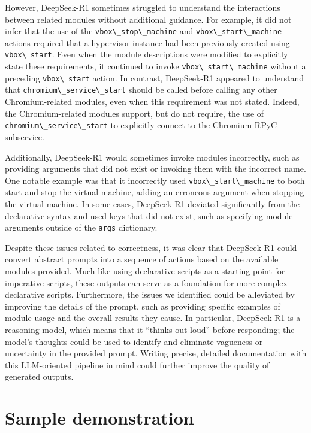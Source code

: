 \documentclass[preprint,12pt]{elsarticle}
\newcommand{\passthrough}[1]{#1}
\begin{document}
However, DeepSeek-R1 sometimes struggled to understand the interactions
between related modules without additional guidance. For example, it did
not infer that the use of the
\passthrough{\lstinline!vbox\_stop\_machine!} and
\passthrough{\lstinline!vbox\_start\_machine!} actions required that a
hypervisor instance had been previously created using
\passthrough{\lstinline!vbox\_start!}. Even when the module descriptions
were modified to explicitly state these requirements, it continued to
invoke \passthrough{\lstinline!vbox\_start\_machine!} without a
preceding \passthrough{\lstinline!vbox\_start!} action. In contrast,
DeepSeek-R1 appeared to understand that
\passthrough{\lstinline!chromium\_service\_start!} should be called
before calling any other Chromium-related modules, even when this
requirement was not stated. Indeed, the Chromium-related modules
support, but do not require, the use of
\passthrough{\lstinline!chromium\_service\_start!} to explicitly connect
to the Chromium RPyC subservice.

Additionally, DeepSeek-R1 would sometimes invoke modules incorrectly,
such as providing arguments that did not exist or invoking them with the
incorrect name. One notable example was that it incorrectly used
\passthrough{\lstinline!vbox\_start\_machine!} to both start and stop
the virtual machine, adding an erroneous argument when stopping the
virtual machine. In some cases, DeepSeek-R1 deviated significantly from
the declarative syntax and used keys that did not exist, such as
specifying module arguments outside of the
\passthrough{\lstinline!args!} dictionary.

Despite these issues related to correctness, it was clear that
DeepSeek-R1 could convert abstract prompts into a sequence of actions
based on the available modules provided. Much like using declarative
scripts as a starting point for imperative scripts, these outputs can
serve as a foundation for more complex declarative scripts. Furthermore,
the issues we identified could be alleviated by improving the details of
the prompt, such as providing specific examples of module usage and the
overall results they cause. In particular, DeepSeek-R1 is a reasoning
model, which means that it ``thinks out loud'' before responding; the
model's thoughts could be used to identify and eliminate vagueness or
uncertainty in the provided prompt. Writing precise, detailed
documentation with this LLM-oriented pipeline in mind could further
improve the quality of generated outputs.

\section{Sample demonstration}\label{sample-demonstration}
\end{document}
